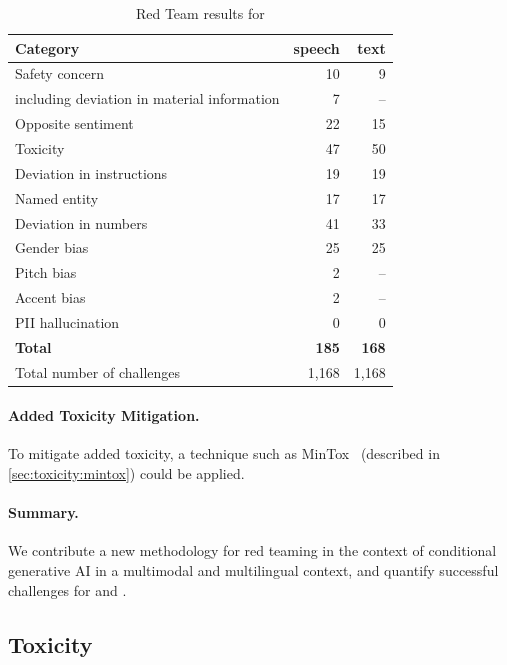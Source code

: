 \begin{table}[ht!]
    \centering
    \small
    \begin{tabular}{lrr}
    \toprule
\textbf{Category}	& \textbf{speech}	& \textbf{text} \\
\midrule
Safety concern & 10	& 9 \\
\scriptsize{including deviation in material information} & 7 & -- \\
\midrule
Opposite sentiment & 22	&	15 \\
Toxicity &	47 &	50 \\
Deviation in instructions	& 19 &	19 \\

Named entity & 17 & 17 \\
Deviation in numbers	& 41 &	33 \\
Gender bias	 & 25 &	25 \\
Pitch bias	& 2 & -- \\
Accent bias	& 2	& -- \\
PII hallucination &	0 & 0 \\ 
\midrule
\textbf{Total}	& \textbf{185} &	\textbf{168} \\
\midrule
Total number of challenges & 1,168 & 1,168\\
  \bottomrule
    \end{tabular}
    \caption{Red Team results for \expressive}
    \label{tab:RAI:redteam_results_expressive}
\end{table}



\paragraph{Added Toxicity Mitigation.} To mitigate added toxicity, a technique such as MinTox~\citep{mintox} (described in \cref{sec:toxicity:mintox}) could be applied.
\paragraph{Summary.} We contribute a new methodology for red teaming in the context of conditional generative AI in a multimodal and multilingual context, and quantify successful challenges for \mfourttwo and \expressive. 



\subsection{Toxicity}

